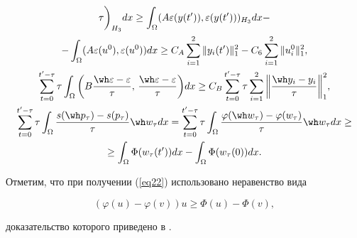\begin{pf}
\begin{gather}
{\tau} \bigg)_{H_{3}} dx \geq \int_{\Omega} 


(A \varepsilon (y(t')), \varepsilon(y(t')))_{H_{3}} dx - \notag \\


%


- \int_{\Omega} (A \varepsilon (u^{0}) , 


\varepsilon (u^{0})) dx \geq C_{A} \sum_{i=1}


^{2} \|y_{i}(t') \|_{1}^{2} - C_6 \sum_{i=1}^{2} 


\| u_{i}^{0} \|_{1}^{2}, \notag \\


%


\sum_{t=0}^{t'- \tau} \tau \int_{\Omega} \bigg(


B \frac{\wh \varepsilon - \varepsilon}{\tau}, \,


\frac{\wh \varepsilon - \varepsilon}{\tau} \bigg) dx \geq


 C_{B} \sum_{t=0}^{t'- \tau} \tau \sum_{i=1}


^{2} \bigg\| \frac{\wh y_{i} - y_{i}}{\tau} \bigg\|_{1}^{2},\notag\\


%


\sum_{t=0}^{t'- \tau} \tau \int_{\Omega} 


\frac{s(\wh p_{\tau})-s(p_{\tau})}{\tau} \wh w_{\tau} dx = 


\sum_{t=0}^{t'- \tau} \tau \int_{\Omega} 


\frac{\varphi(\wh w_{\tau})- \varphi(w_{\tau})}{\tau} \wh w_


{\tau} dx \geq \notag \\


%


\geq \int_{\Omega} \Phi (w_{\tau}(t')) dx


 - \int_{\Omega} \Phi (w_{\tau}(0)) dx.


\label{eq22}


\end{gather}


Отметим, что при получении (\ref{eq22}) использовано неравенство вида


\begin{equation}


(\varphi (u) - \varphi(v)) u \geq \Phi (u) - \Phi (v),


\label{eq22.1}


\end{equation}


доказательство которого приведено в \cite{4}.






\end{pf}
